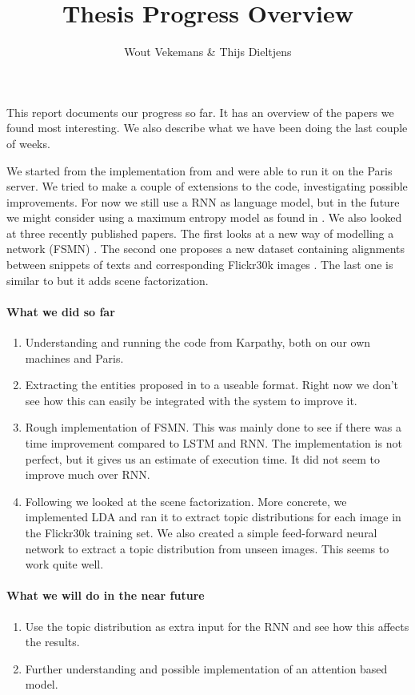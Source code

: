 \documentclass{article}
\title{Thesis Progress Overview}
\author{Wout Vekemans \& Thijs Dieltjens}
\begin{document}
\maketitle
This report documents our progress so far. It has an overview of the papers we found most interesting. We also describe what we have been doing the last couple of weeks. 

We started from the implementation from \cite{Karpathy} and were able to run it on the Paris server. We tried to make a couple of extensions to the code, investigating possible improvements. For now we still use a RNN as language model, but in the future we might consider using a maximum entropy model as found in \cite{Fang2015}. We also looked at three recently published papers. The first looks at a new way of modelling a network (FSMN) \cite{Zhang2015}. The second one proposes a new dataset containing alignments between snippets of texts and corresponding Flickr30k images \cite{Plummer2015}. The last one is similar to \cite{Xu2015} but it adds scene factorization. \cite{Jin2015}

\paragraph{What we did so far}
\begin{enumerate}
	\item Understanding and running the code from Karpathy, both on our own machines and Paris. 
	\item Extracting the entities proposed in \cite{Plummer2015} to a useable format. Right now we don't see how this can easily be integrated with the system to improve it.
	\item Rough implementation of FSMN. This was mainly done to see if there was a time improvement compared to LSTM and RNN. The implementation is not perfect, but it gives us an estimate of execution time. It did not seem to improve much over RNN.
	\item Following \cite{Jin2015} we looked at the scene factorization. More concrete, we implemented LDA and ran it to extract topic distributions for each image in the Flickr30k training set. We also created a simple feed-forward neural network to extract a topic distribution from unseen images. This seems to work quite well. 
\end{enumerate}

\paragraph{What we will do in the near future}
\begin{enumerate}
	\item Use the topic distribution as extra input for the RNN and see how this affects the results.
	\item Further understanding and possible implementation of an attention based model.
\end{enumerate}





\end{document}
